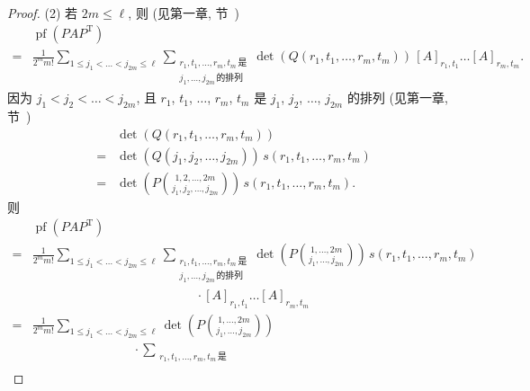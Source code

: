 \documentclass[../libro]{subfiles}
\begin{document}
\begin{proof}
    (2)
    若 \(2m \leq \ell\),
    则 (见第一章, 节~)
    \begin{align*}
             &
        \operatorname{pf} {(P A P^{\mathrm{T}})}
        \\
        = {} &
        \frac{1}{2^m m!}
        \sum_{1 \leq j_1 < \dots < j_{2m} \leq \ell}
        \sum_{\substack{
        r_1, t_1, \dots, r_m, t_m\,\text{是} \\
                j_1, \dots, j_{2m}\,\text{的排列}
            }}
        \det {(Q(r_1, t_1, \dots, r_m, t_m))}
        \,
        [A]_{r_1,t_1} \dots [A]_{r_m,t_m}.
    \end{align*}
    因为 \(j_1 < j_2 < \dots < j_{2m}\),
    且 \(r_1\), \(t_1\), \(\dots\), \(r_m\), \(t_m\)
    是 \(j_1\), \(j_2\), \(\dots\), \(j_{2m}\) 的排列
    (见第一章, 节~)
    \begin{align*}
             &
        \det {(Q(r_1, t_1, \dots, r_m, t_m))}
        \\
        = {} &
        \det {(Q(j_1, j_2, \dots, j_{2m}))}\,
        s(r_1, t_1, \dots, r_m, t_m)
        \\
        = {} &
        \det {\left(
            P\binom{1,2,\dots,2m}{j_1,j_2,\dots,j_{2m}}
            \right)}\,
        s(r_1, t_1, \dots, r_m, t_m).
    \end{align*}
    则
    \begin{align*}
             &
        \operatorname{pf} {(P A P^{\mathrm{T}})}
        \\
        = {} &
        \frac{1}{2^m m!}
        \sum_{1 \leq j_1 < \dots < j_{2m} \leq \ell}
        \sum_{\substack{
        r_1, t_1, \dots, r_m, t_m\,\text{是} \\
                j_1, \dots, j_{2m}\,\text{的排列}
            }}
        \det {\left(
            P\binom{1,\dots,2m}{j_1,\dots,j_{2m}}
            \right)}\,
        s(r_1, t_1, \dots, r_m, t_m)
        \\
             &
        \quad \quad \quad \quad \quad \quad \quad \quad \quad \quad \quad \quad \quad
        \cdot
        [A]_{r_1,t_1} \dots [A]_{r_m,t_m}
        \\
        = {} &
        \frac{1}{2^m m!}
        \sum_{1 \leq j_1 < \dots < j_{2m} \leq \ell}
        \det {\left(
            P\binom{1,\dots,2m}{j_1,\dots,j_{2m}}
            \right)}
        \\
             &
        \quad \quad \quad \quad \quad \quad \quad \quad
        \cdot
        \sum_{\substack{
        r_1, t_1, \dots, r_m, t_m\,\text{是} \\
}}
\end{align*}
\end{proof}
\end{document}
